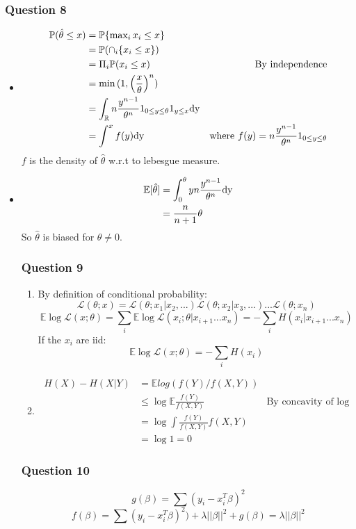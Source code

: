 \documentclass[12pt]{article}
\newcommand{\Q}[1]{\subsubsection*{Question #1}}
\begin{document}
\Q{8}
\begin{itemize}

\item
\begin{align}
  \mathbb{P}(\hat \theta \leq x) &= \mathbb{P}\{ \text{max}_i \, x_i \leq x \}\\
  &= \mathbb{P}(\cap_i \{ x_i \leq x \})\\
  &= \Pi_i \mathbb{P}(x_i \leq x) &\text{ By independence}\\ 
  &= \text{min} \, (1, \left(\frac{x}{\theta}\right)^n)\\
  &= \int_{\mathbb{R}} n \frac{y^{n-1}}{\theta^n} 1_{0 \leq y \leq \theta} 1_{y \leq x} \rm{dy} \\
  &= \int^x f(y) \rm{dy} & \text{where $f(y) = n \frac{y^{n-1}}{\theta^n} 1_{0 \leq y \leq \theta}$}
\end{align}
 $f$ is the density of $\hat \theta$ w.r.t to lebesgue measure.


\item
\begin{align}
\mathbb{E}[ \hat \theta] 
&= \int_0^{\theta} y n \frac{y^{n-1}}{\theta^n} \rm{dy} \\
&= \frac{n}{n+1} \theta 
\end{align}
So $\hat \theta$ is biased for $\theta \neq 0$.

\Q{9}
\begin{enumerate}

\item

By definition of conditional probability:
$$\mathcal{L}(\theta; x) = \mathcal{L}(\theta; x_1 | x_2,...) \mathcal{L}(\theta; x_2 | x_3,...) ... \mathcal{L}(\theta; x_n)$$
$$\mathbb{E} \log \mathcal{L}(x; \theta) = \sum_i \mathbb{E} \log\mathcal{L}(x_i; \theta | x_{i+1} ... x_n) = - \sum_i H(x_i|x_{i+1}...x_n)$$
If the $x_i$ are iid:
$$\mathbb{E} \log \mathcal{L}(x; \theta) = - \sum_i H(x_i)$$

\item
\begin{align}
H(X) - H(X|Y) &= 
\mathbb{E} log(f(Y)/f(X,Y)) \\
&\leq \log \mathbb{E} \frac{f(Y)}{f(X,Y)} &\text{By concavity of $\log$}\\
&= \log \int \frac{f(Y)}{f(X,Y)} f(X,Y)\\
&= \log 1 = 0
\end{align}
\end{enumerate}
\Q{10}


$$g(\beta) = \sum (y_i - x_i^T \beta)^2$$
$$f(\beta) = \sum (y_i - x_i^T \beta)^2) + \lambda ||\beta||^2 + g(\beta) = \lambda ||\beta||^2$$


\end{itemize}
\end{document}
